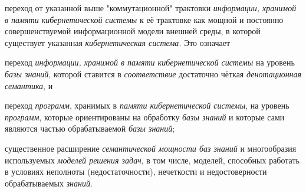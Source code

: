 \begin{scnsubstruct}
{\begin{scnitemize}
	\item переход от указанной выше "коммутационной"{} трактовки \textit{информации, хранимой в памяти кибернетической системы} к её трактовке как мощной и постоянно совершенствуемой информационной модели внешней среды, в которой существует указанная \textit{кибернетическая система}. Это означает
	\begin{scnitemizeii}
		\item переход \textit{информации, хранимой в памяти кибернетической системы} на уровень \textit{базы знаний}, которой ставится в \textit{соответствие} достаточно чёткая \textit{денотационная семантика}, и
		\item переход \textit{программ}, хранимых в \textit{памяти кибернетической системы}, на уровень \textit{программ}, которые ориентированы на обработку \textit{базы знаний} и которые сами являются частью обрабатываемой \textit{базы знаний};
	\end{scnitemizeii}
	\item существенное расширение \textit{семантической мощности баз знаний} и многообразия используемых \textit{моделей решения задач}, в том числе, моделей, способных работать в условиях неполноты (недостаточности), нечеткости и недостоверности обрабатываемых \textit{знаний}.
\end{scnitemize}
}



\end{scnsubstruct}

